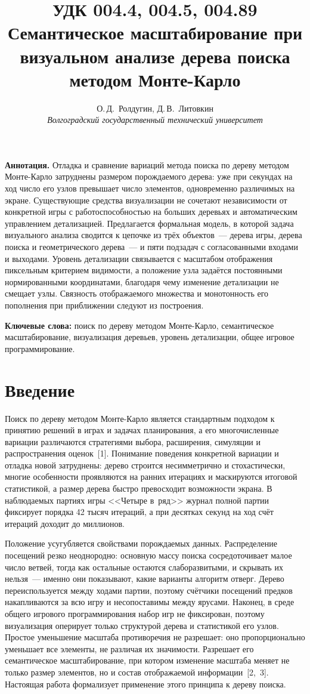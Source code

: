 \documentclass[12pt,a4paper]{article}
\title{\vspace{-1.5cm}\normalsize УДК 004.4, 004.5, 004.89\\[0.6cm]
\Large\bfseries Семантическое масштабирование при визуальном анализе
дерева поиска методом Монте-Карло}
\author{\normalsize О.\,Д.~Ролдугин, Д.\,В.~Литовкин\\
\normalsize\itshape Волгоградский государственный технический университет}
\date{}
\begin{document}
\maketitle
\thispagestyle{empty}

\noindent\textbf{Аннотация.} Отладка и сравнение вариаций метода поиска по
дереву методом Монте-Карло затруднены размером порождаемого дерева: уже при
секундах на ход число его узлов превышает число элементов, одновременно
различимых на экране. Существующие средства визуализации не сочетают
независимости от конкретной игры с работоспособностью на больших деревьях и
автоматическим управлением детализацией. Предлагается формальная модель, в
которой задача визуального анализа сводится к цепочке из трёх объектов~---
дерева игры, дерева поиска и геометрического дерева~--- и пяти подзадач с
согласованными входами и выходами. Уровень детализации связывается с
масштабом отображения пиксельным критерием видимости, а положение узла
задаётся постоянными нормированными координатами, благодаря чему изменение
детализации не смещает узлы. Связность отображаемого множества и
монотонность его пополнения при приближении следуют из построения.

\smallskip
\noindent\textbf{Ключевые слова:} поиск по дереву методом Монте-Карло,
семантическое масштабирование, визуализация деревьев, уровень детализации,
общее игровое программирование.

\section{Введение}

Поиск по дереву методом Монте-Карло является стандартным подходом к принятию
решений в играх и задачах планирования, а его многочисленные вариации
различаются стратегиями выбора, расширения, симуляции и распространения
оценок~[1]. Понимание поведения конкретной вариации и отладка новой
затруднены: дерево строится несимметрично и стохастически, многие
особенности проявляются на ранних итерациях и маскируются итоговой
статистикой, а размер дерева быстро превосходит возможности экрана. В
наблюдаемых партиях игры <<Четыре в~ряд>> журнал полной партии фиксирует
порядка 42 тысяч итераций, а при десятках секунд на ход счёт итераций
доходит до миллионов.

Положение усугубляется свойствами порождаемых данных. Распределение
посещений резко неоднородно: основную массу поиска сосредоточивает малое
число ветвей, тогда как остальные остаются слаборазвитыми, и скрывать их
нельзя~--- именно они показывают, какие варианты алгоритм отверг. Дерево
переиспользуется между ходами партии, поэтому счётчики посещений предков
накапливаются за всю игру и несопоставимы между ярусами. Наконец, в среде
общего игрового программирования набор игр не фиксирован, поэтому
визуализация оперирует только структурой дерева и статистикой его узлов.
Простое уменьшение масштаба противоречия не разрешает: оно пропорционально
уменьшает все элементы, не различая их значимости. Разрешает его
семантическое масштабирование, при котором изменение масштаба меняет не
только размер элементов, но и состав отображаемой информации~[2,~3].
Настоящая работа формализует применение этого принципа к дереву поиска.
\end{document}
